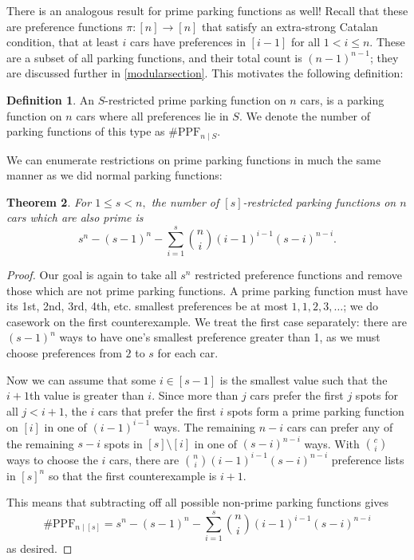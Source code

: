 \documentclass[12 pt]{amsart}
\newtheorem{theorem}{Theorem}[section]
\theoremstyle{definition} %
\newtheorem{definition}[theorem]{Definition}
\theoremstyle{remark} %
\begin{document}
There is an analogous result for prime parking functions as well! Recall that these are preference functions $\pi:[n]\to[n]$ that satisfy an extra-strong Catalan condition, that at least $i$ cars have preferences in $[i-1]$ for all $1<i\le n.$ These are a subset of all parking functions, and their total count is $(n-1)^{n-1}$; they are discussed further in \ref{modularsection}. This motivates the following definition:

\begin{definition}
    An $S$-restricted prime parking function on $n$ cars, is a parking function on $n$ cars where all preferences lie in $S.$ We denote the number of parking functions of this type as $\# \mathrm{PPF}_{n\mid S}.$
\end{definition}

We can enumerate restrictions on prime parking functions in much the same manner as we did normal parking functions:

\begin{theorem}
    \label{thm:resPPFcount1}
    For $1 \le s < n,$ the number of $[s]$-restricted parking functions on $n$ cars which are also prime is 
    \[s^{n} - (s - 1)^{n} - \sum_{i = 1}^{s} \binom{n}{i} (i - 1)^{i - 1} (s - i)^{n - i}.\]
\end{theorem}

\begin{proof}
	Our goal is again to take all $s^n$ restricted preference functions and remove those which are not prime parking functions. A prime parking function must have its 1st, 2nd, 3rd, 4th, etc. smallest preferences be at most $1,1,2,3,\ldots$; we do casework on the first counterexample. We treat the first case separately: there are $(s-1)^n$ ways to have one's smallest preference greater than 1, as we must choose preferences from $2$ to $s$ for each car.
    
    Now we can assume that some $i\in [s-1]$ is the smallest value such that the $i+1$th value is greater than $i$. Since more than $j$ cars prefer the first $j$ spots for all $j < i+1$, the $i$ cars that prefer the first $i$ spots form a prime parking function on $[i]$ in one of $(i - 1)^{i - 1}$ ways. The remaining $n - i$ cars can prefer any of the remaining $s - i$ spots in $[s] \setminus [i]$ in one of $(s - i)^{n - i}$ ways. With $\binom{c}{i}$ ways to choose the $i$ cars, there are $\binom{n}{i} (i - 1)^{i - 1} (s - i)^{n - i}$ preference lists in $[s]^{n}$ so that the first counterexample is $i+1$.

    This means that subtracting off all possible non-prime parking functions gives
	\[
		\# \mathrm{PPF}_{n \mid [s]} = s^{n} - (s - 1)^{n} - \sum_{i = 1}^{s} \binom{n}{i} (i - 1)^{i - 1} (s - i)^{n - i}
	\]
    as desired.
\end{proof}
\end{document}

